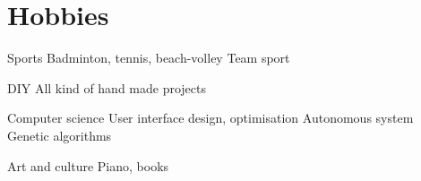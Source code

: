 \documentclass[]{friggeri-cv}
\begin{document}
	\section{Hobbies}
	
	\begin{entrylist}
		
		\entry
		{Sports}
		{Badminton, tennis, beach-volley}
		{Team sport}
		{}
		
		\entry
		{DIY}
		{All kind of hand made projects}
		{}
		{}
				
		\entry
		{Computer science}
		{User interface design, optimisation}
		{Autonomous system}
		{Genetic algorithms}
		
		\entry
		{Art and culture}
		{Piano, books}
		{}
		{}
		
	\end{entrylist}
\end{document}
